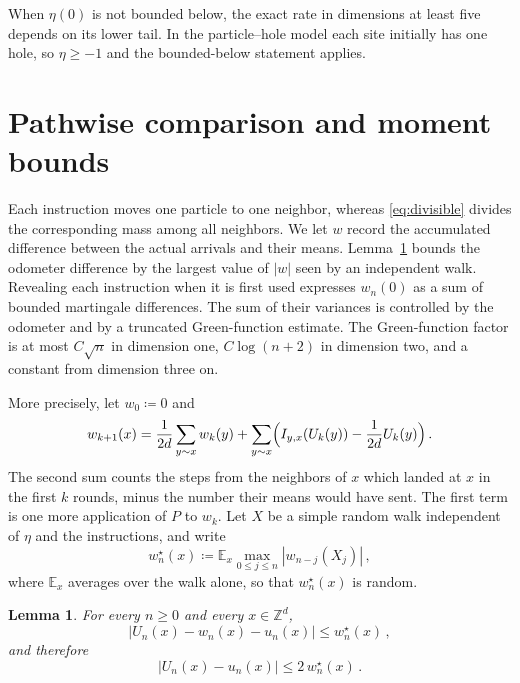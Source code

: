 \documentclass[11pt]{amsart}
\theoremstyle{plain}
\newtheorem{lemma}[theorem]{Lemma}
\theoremstyle{definition}
\newcommand{\Z}{\mathbb{Z}}
\newcommand{\E}{\mathbb{E}}
\begin{document}
When $\eta(0)$ is not bounded below, the exact rate in dimensions at least five
depends on its lower tail. In the particle--hole model each site initially has
one hole, so $\eta\geq-1$ and the bounded-below statement applies.

\section{Pathwise comparison and moment bounds}\label{sec:routing}

Each instruction moves one particle to one neighbor, whereas
\eqref{eq:divisible} divides the corresponding mass among all neighbors. We
let $w$ record the accumulated difference between the actual arrivals and
their means. Lemma~\ref{lem:pathwise-comparison}
bounds the odometer difference by the largest value of $|w|$ seen by an
independent walk. Revealing each instruction when it is first used expresses
$w_n(0)$ as a sum of bounded martingale differences. The sum of their
variances is controlled by the odometer and by a truncated Green-function
estimate. The Green-function factor is at most $C\sqrt n$ in dimension one,
$C\log(n+2)$ in dimension two, and a constant from dimension three on.

More precisely, let $w_0\coloneqq0$ and
\begin{equation}\label{eq:error-recursion}
	w_{k+1}(x)=\frac1{2d}\sum_{y\sim x}w_k(y)
	+\sum_{y\sim x}\Bigl(I_{y,x}(U_k(y))-\frac1{2d}U_k(y)\Bigr)\,.
\end{equation}
The second sum counts the steps from the neighbors of $x$ which landed at $x$ in
the first $k$ rounds, minus the number their means would have sent. The first
term is one more application of $P$ to $w_k$.
Let $X$ be a simple random walk independent of $\eta$ and the instructions, and write
\[
	w_n^\star(x)\coloneqq\E_x\max_{0\leq j\leq n}|w_{n-j}(X_j)|\,,
\]
where $\E_x$ averages over the walk alone, so that $w_n^\star(x)$ is random.

\begin{lemma}\label{lem:pathwise-comparison}
	For every $n\geq0$ and every $x\in\Z^d$,
	\begin{equation}\label{eq:pathwise-error}
		|U_n(x)-w_n(x)-u_n(x)|\leq w_n^\star(x)\,,
	\end{equation}
	and therefore
	\begin{equation}\label{eq:pathwise-comparison}
		|U_n(x)-u_n(x)|\leq2\,w_n^\star(x)\,.
	\end{equation}
\end{lemma}
\end{document}
